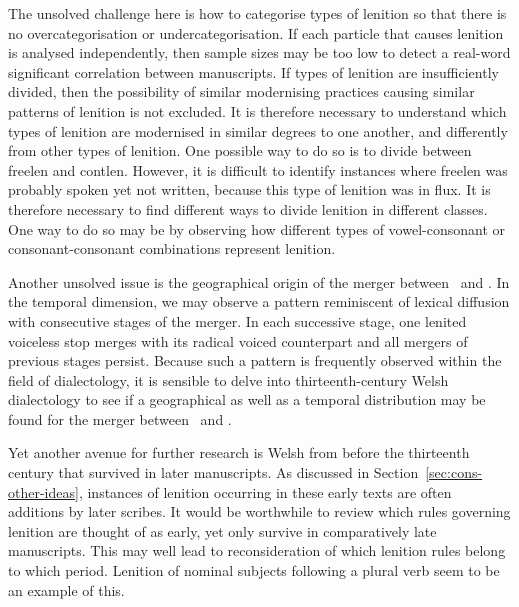 The unsolved challenge here is how to categorise types of lenition so that there is no overcategorisation or undercategorisation. If each particle that causes lenition is analysed independently, then sample sizes may be too low to detect a real-word significant correlation between manuscripts. If types of lenition are insufficiently divided, then the possibility of similar modernising practices causing similar patterns of lenition is not excluded. It is therefore necessary to understand which types of lenition are modernised in similar degrees to one another, and differently from other types of lenition. One possible way to do so is to divide between \gls{freelen} and \gls{contlen}. However, it is difficult to identify instances where \gls{freelen} was probably spoken yet not written, because this type of lenition was in flux. It is therefore necessary to find different ways to divide lenition in different classes. One way to do so may be by observing how different types of vowel-consonant or consonant-consonant combinations represent lenition.

Another unsolved issue is the geographical origin of the merger between \lT\ and \xD. In the temporal dimension, we may observe a pattern reminiscent of lexical diffusion with consecutive stages of the merger. In each successive stage, one lenited voiceless stop merges with its radical voiced counterpart and all mergers of previous stages persist. Because such a pattern is frequently observed within the field of dialectology, it is sensible to delve into thirteenth-century Welsh dialectology to see if a geographical as well as a temporal distribution may be found for the merger between \lT\ and \xD.

Yet another avenue for further research is Welsh from before the thirteenth century that survived in later manuscripts. As discussed in Section~\ref{sec:cons-other-ideas}, instances of lenition occurring in these early texts are often additions by later scribes. It would be worthwhile to review which rules governing lenition are thought of as early, yet only survive in comparatively late manuscripts. This may well lead to reconsideration of which lenition rules belong to which period. Lenition of nominal subjects following a plural verb seem to be an example of this.


